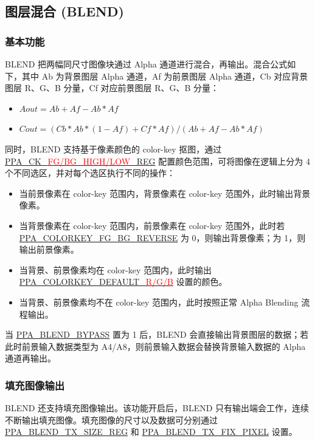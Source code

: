 \documentclass[main\_\_CN.tex]{subfiles}
\begin{document}
\subsection{图层混合 (BLEND)}

\subsubsection{基本功能}
BLEND 把两幅同尺寸图像块通过 Alpha 通道进行混合，再输出。混合公式如下，其中 Ab 为背景图层 Alpha 通道，Af 为前景图层 Alpha 通道，Cb 对应背景图层 R、G、B 分量，Cf 对应前景图层 R、G、B 分量：
\begin{itemize}
    \item $Aout = Ab + Af - Ab*Af$
    \item $Cout = (Cb*Ab*(1-Af) + Cf*Af) / (Ab + Af - Ab*Af)$
\end{itemize}

同时，BLEND 支持基于像素颜色的 color-key 抠图，通过 \hyperref[regdesc:PPACKBGLOWREG]{PPA\_CK\_\textcolor{red}{FG/BG}\_\textcolor{red}{HIGH/LOW}\_REG} 配置颜色范围，可将图像在逻辑上分为 4 个不同选区，并对每个选区执行不同的操作：
\begin{itemize}
    \item 当前景像素在 color-key 范围内，背景像素在 color-key 范围外，此时输出背景像素。
    \item 当背景像素在 color-key 范围内，前景像素在 color-key 范围外，此时若 \hyperref[fielddesc:PPACOLORKEYFGBGREVERSE]{PPA\_COLORKEY\_FG\_BG\_REVERSE} 为 0，则输出背景像素；为 1，则输出前景像素。
    \item 当背景、前景像素均在 color-key 范围内，此时输出 \hyperref[fielddesc:PPACOLORKEYDEFAULTB]{PPA\_COLORKEY\_DEFAULT\_\textcolor{red}{R/G/B}} 设置的颜色。
    \item 当背景、前景像素均不在 color-key 范围内，此时按照正常 Alpha Blending 流程输出。
\end{itemize}

当 \hyperref[fielddesc:PPABLENDBYPASS]{PPA\_BLEND\_BYPASS} 置为 1 后，BLEND 会直接输出背景图层的数据；若此时前景输入数据类型为 A4/A8，则前景输入数据会替换背景输入数据的 Alpha 通道再输出。

\subsubsection{填充图像输出}
BLEND 还支持填充图像输出。该功能开启后，BLEND 只有输出端会工作，连续不断输出填充图像。填充图像的尺寸以及数据可分别通过 \hyperref[regdesc:PPABLENDTXSIZEREG]{PPA\_BLEND\_TX\_SIZE\_REG} 和 \hyperref[fielddesc:PPABLENDTXFIXPIXEL]{PPA\_BLEND\_TX\_FIX\_PIXEL} 设置。
\end{document}
